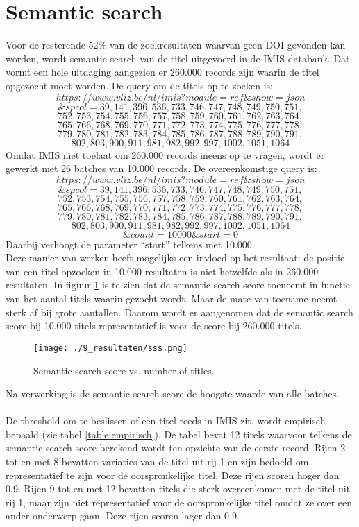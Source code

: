 \section{Semantic search}
Voor de resterende 52\% van de zoekresultaten waarvan geen DOI gevonden kan worden, wordt semantic search van de titel uitgevoerd in de IMIS databank. Dat vormt een hele uitdaging aangezien er 260.000 records zijn waarin de titel opgezocht moet worden.
De query om de titels op te zoeken is:
\[https://www.vliz.be/nl/imis?module=ref\&show=json\]
\[\&spcol=39,141,396,536,733,746,747,748,749,750,751,\]
\[752,753,754,755,756,757,758,759,760,761,762,763,764,\]
\[765,766,768,769,770,771,772,773,774,775,776,777,778,\]
\[779,780,781,782,783,784,785,786,787,788,789,790,791,\]
\[802,803,900,911,981,982,992,997,1002,1051,1064\]
Omdat IMIS niet toelaat om 260.000 records ineens op te vragen, wordt er gewerkt met 26 batches van 10.000 records. De overeenkomstige query is:
\[https://www.vliz.be/nl/imis?module=ref\&show=json\]
\[\&spcol=39,141,396,536,733,746,747,748,749,750,751,\]
\[752,753,754,755,756,757,758,759,760,761,762,763,764,\]
\[765,766,768,769,770,771,772,773,774,775,776,777,778,\]
\[779,780,781,782,783,784,785,786,787,788,789,790,791,\]
\[802,803,900,911,981,982,992,997,1002,1051,1064\]
\[\&count=10000\&start=0\]
Daarbij verhoogt de parameter ``start'' telkens met 10.000.\\
Deze manier van werken heeft mogelijks een invloed op het resultaat: de positie van een titel opzoeken in 10.000 resultaten is niet hetzelfde als in 260.000 resultaten.
In figuur \ref{fig:GSsss} is te zien dat de semantic search score toeneemt in functie van het aantal titels waarin gezocht wordt. Maar de mate van toename neemt sterk af bij grote aantallen. Daarom wordt er aangenomen dat de semantic search score bij 10.000 titels representatief is voor de score bij 260.000 titels.\\
\begin{figure}[h!]
    \centering
    \texttt{[image: ./9\_resultaten/sss.png]}
    \caption[Semantic search score vs. number of titles.]{\label{fig:GSsss}Semantic search score vs. number of titles.}
\end{figure}
Na verwerking is de semantic search score de hoogste waarde van alle batches.\\\\
De threshold om te beslissen of een titel reeds in IMIS zit, wordt empirisch bepaald (zie tabel \ref{table:empirisch}). De tabel bevat 12 titels waarvoor telkens de semantic search score berekend wordt ten opzichte van de eerste record. Rijen 2 tot en met 8 bevatten variaties van de titel uit rij 1 en zijn bedoeld om representatief te zijn voor de oorspronkelijke titel. Deze rijen scoren hoger dan 0.9. Rijen 9 tot en met 12 bevatten titels die sterk overeenkomen met de titel uit rij 1, maar zijn niet representatief voor de oorspronkelijke titel omdat ze over een ander onderwerp gaan. Deze rijen scoren lager dan 0.9.\\
